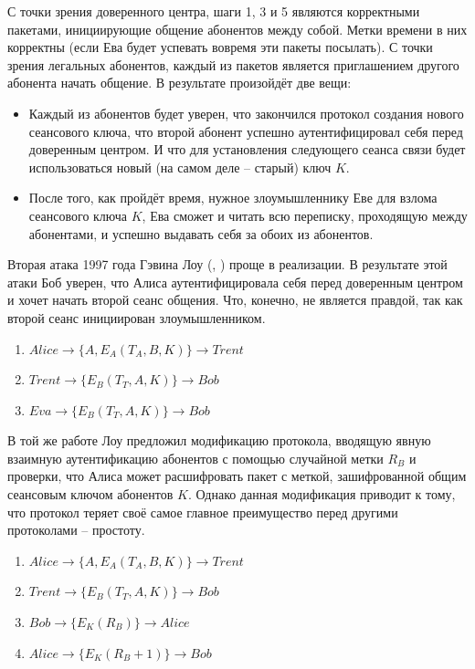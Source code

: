 С точки зрения доверенного центра, шаги 1, 3 и 5 являются корректными пакетами, инициирующие общение абонентов между собой. Метки времени в них корректны (если Ева будет успевать вовремя эти пакеты посылать). С точки зрения легальных абонентов, каждый из пакетов является приглашением другого абонента начать общение. В результате произойдёт две вещи:

\begin{itemize}
	\item Каждый из абонентов будет уверен, что закончился протокол создания нового сеансового ключа, что второй абонент успешно аутентифицировал себя перед доверенным центром. И что для установления следующего сеанса связи будет использоваться новый (на самом деле -- старый) ключ $K$.
	\item После того, как пройдёт время, нужное злоумышленнику Еве для взлома сеансового ключа $K$, Ева сможет и читать всю переписку, проходящую между абонентами, и успешно выдавать себя за обоих из абонентов.
\end{itemize}

Вторая атака 1997 года Гэвина Лоу (, \cite{Lowe:1997}) проще в реализации. В результате этой атаки Боб уверен, что Алиса аутентифицировала себя перед доверенным центром и хочет начать второй сеанс общения. Что, конечно, не является правдой, так как второй сеанс инициирован злоумышленником.

\begin{enumerate}
	\item $ Alice \rightarrow \{ A, E_A \left( T_A, B, K \right) \} \rightarrow Trent $
	\item $ Trent \rightarrow \{ E_B \left( T_T, A, K \right) \} \rightarrow Bob $
	\item $ Eva \rightarrow \{ E_B \left( T_T, A, K \right) \} \rightarrow Bob $
\end{enumerate}

В той же работе Лоу предложил модификацию протокола, вводящую явную взаимную аутентификацию абонентов с помощью случайной метки $R_B$ и проверки, что Алиса может расшифровать пакет с меткой, зашифрованной общим сеансовым ключом абонентов $K$. Однако данная модификация приводит к тому, что протокол теряет своё самое главное преимущество перед другими протоколами -- простоту.

\begin{enumerate}
	\item $ Alice \rightarrow \{ A, E_A \left( T_A, B, K \right) \} \rightarrow Trent $
	\item $ Trent \rightarrow \{ E_B \left( T_T, A, K \right) \} \rightarrow Bob $
	\item $ Bob \rightarrow \{ E_K \left( R_B \right) \} \rightarrow Alice $
	\item $ Alice \rightarrow \{ E_K \left( R_B + 1 \right) \} \rightarrow Bob $
\end{enumerate}

